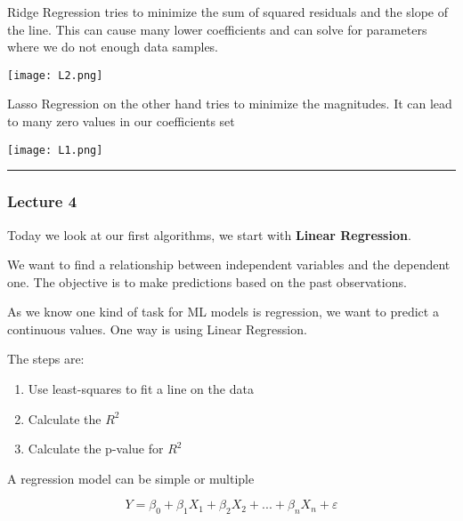 \vspace{10pt}

Ridge Regression tries to minimize the sum of squared residuals and the slope of the line. This can cause many lower coefficients and can solve for parameters where we do not enough data samples.

\texttt{[image: L2.png]}

\vspace{10pt}

Lasso Regression on the other hand tries to minimize the magnitudes. It can lead to many zero values in our coefficients set


\texttt{[image: L1.png]}





\hrule



\subsubsection{Lecture 4}

Today we look at our first algorithms, we start with \textbf{Linear Regression}.

\vspace{10pt}

We want to find a relationship between independent variables and the dependent one. The objective is to make predictions based on the past observations.

\vspace{10pt}

As we know one kind of task for ML models is regression, we want to predict a continuous values. One way is using Linear Regression.

The steps are:
\begin{enumerate}
    \item Use least-squares to fit a line on the data
    \item Calculate the $R^2$
    \item Calculate the p-value for $R^2$
\end{enumerate}

A regression model can be simple or multiple

\begin{equation}
    Y = \beta_0 + \beta_1X_1+ \beta_2X_2+...+\beta_nX_n+\varepsilon
\end{equation}


